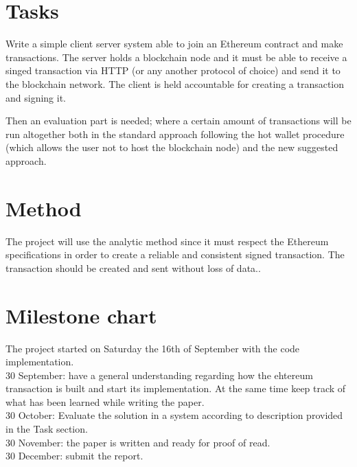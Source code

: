 \documentclass[paper=a4, fontsize=11pt]{scrartcl} %
\numberwithin{equation}{section} %
\numberwithin{figure}{section} %
\numberwithin{table}{section} %
\begin{document}
\section{Tasks}

Write a simple client server system able to join an Ethereum contract and make transactions. The server holds a blockchain node and it must be able to receive a singed transaction via HTTP (or any another protocol of choice) and send it to the blockchain network. The client is held accountable for creating a transaction and signing it.  

Then an evaluation part is needed; where a certain amount of transactions will be run altogether both in the standard approach following the hot wallet procedure (which allows the user not to host the blockchain node) and the new suggested approach.

\section{Method}

The project will use the analytic method since it must respect the Ethereum specifications in order to create a reliable and consistent signed transaction. The transaction should be created and sent without loss of data..

\section{Milestone chart}

The project started on Saturday the 16th of September with the code implementation. \\

30 September: have a general understanding regarding how the ehtereum transaction is built and start its implementation. At the same time keep track of what has been learned while writing the paper. \\

30 October: Evaluate the solution in a system according to description provided in the Task section. \\

30 November: the paper is written and ready for proof of read. \\

30 December: submit the report. \\

\printbibliography
%
\end{document}
